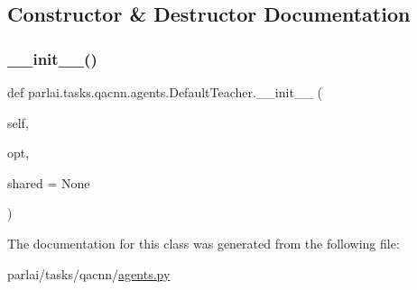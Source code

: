 \subsection{Constructor \& Destructor Documentation}
\mbox{\label{classparlai_1_1tasks_1_1qacnn_1_1agents_1_1DefaultTeacher_a3b62aec4d32ee140251318598822f31c}} 
\subsubsection{\texorpdfstring{\+\_\+\+\_\+init\+\_\+\+\_\+()}{\_\_init\_\_()}}
{\footnotesize\ttfamily def parlai.\+tasks.\+qacnn.\+agents.\+Default\+Teacher.\+\_\+\+\_\+init\+\_\+\+\_\+ (\begin{DoxyParamCaption}\item[{}]{self,  }\item[{}]{opt,  }\item[{}]{shared = {\ttfamily None} }\end{DoxyParamCaption})}



The documentation for this class was generated from the following file\+:\begin{DoxyCompactItemize}
\item 
parlai/tasks/qacnn/\hyperlink{parlai_2tasks_2qacnn_2agents_8py}{agents.\+py}\end{DoxyCompactItemize}
